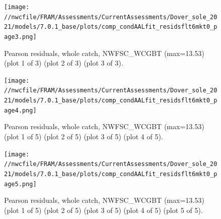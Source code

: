 \documentclass[11pt,
  english,
  a4paper,
]{article}
\begin{document}
\tagmcend\tagstructend


\begin{figure}
\centering
\texttt{[image: //nwcfile/FRAM/Assessments/CurrentAssessments/Dover\_sole\_2021/models/7.0.1\_base/plots/comp\_condAALfit\_residsflt6mkt0\_page3.png]}
\caption{Pearson residuals, whole catch, NWFSC\_WCGBT (max=13.53) (plot 1 of 3) (plot 2 of 3) (plot 3 of 3).\label{fig:comp_condAALfit_residsflt6mkt0_page3}}
\end{figure}

\tagmcend\tagstructend


\begin{figure}
\centering
\texttt{[image: //nwcfile/FRAM/Assessments/CurrentAssessments/Dover\_sole\_2021/models/7.0.1\_base/plots/comp\_condAALfit\_residsflt6mkt0\_page4.png]}
\caption{Pearson residuals, whole catch, NWFSC\_WCGBT (max=13.53) (plot 1 of 5) (plot 2 of 5) (plot 3 of 5) (plot 4 of 5).\label{fig:comp_condAALfit_residsflt6mkt0_page4}}
\end{figure}

\tagmcend\tagstructend


\begin{figure}
\centering
\texttt{[image: //nwcfile/FRAM/Assessments/CurrentAssessments/Dover\_sole\_2021/models/7.0.1\_base/plots/comp\_condAALfit\_residsflt6mkt0\_page5.png]}
\caption{Pearson residuals, whole catch, NWFSC\_WCGBT (max=13.53) (plot 1 of 5) (plot 2 of 5) (plot 3 of 5) (plot 4 of 5) (plot 5 of 5).\label{fig:comp_condAALfit_residsflt6mkt0_page5}}
\end{figure}

\tagmcend\tagstructend
\end{document}
